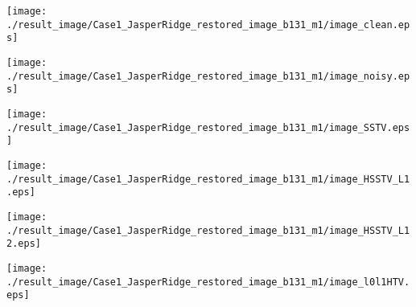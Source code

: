 \begin{figure*}[t]
    \begin{center}
        \begin{minipage}{0.150\hsize}
            \centerline{\texttt{[image: ./result\_image/Case1\_JasperRidge\_restored\_image\_b131\_m1/image\_clean.eps]}} %
        \end{minipage}
        \begin{minipage}{0.150\hsize}
            \centerline{\texttt{[image: ./result\_image/Case1\_JasperRidge\_restored\_image\_b131\_m1/image\_noisy.eps]}} %
        \end{minipage}
        \begin{minipage}{0.150\hsize}
            \centerline{\texttt{[image: ./result\_image/Case1\_JasperRidge\_restored\_image\_b131\_m1/image\_SSTV.eps]}} %
        \end{minipage}
        \begin{minipage}{0.150\hsize}
            \centerline{\texttt{[image: ./result\_image/Case1\_JasperRidge\_restored\_image\_b131\_m1/image\_HSSTV\_L1.eps]}} %
        \end{minipage}
        \begin{minipage}{0.150\hsize}
            \centerline{\texttt{[image: ./result\_image/Case1\_JasperRidge\_restored\_image\_b131\_m1/image\_HSSTV\_L12.eps]}} %
        \end{minipage}
        \begin{minipage}{0.150\hsize}
            \centerline{\texttt{[image: ./result\_image/Case1\_JasperRidge\_restored\_image\_b131\_m1/image\_l0l1HTV.eps]}} %
        \end{minipage}
        \begin{minipage}{0.055\hsize}
            \centerline{\hspace{\hsize}} %
        \end{minipage}

        \vspace{1mm}


\end{center}
\end{figure*}
